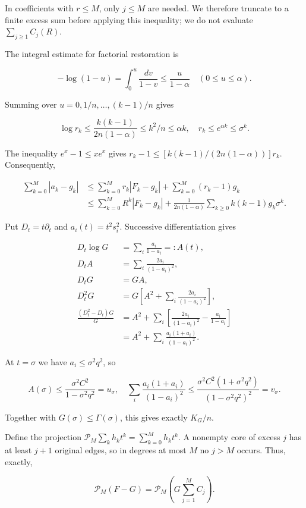 \documentclass[11pt,a4paper]{article}
\begin{document}
In coefficients with \(r\le M\), only \(j\le M\) are needed. We therefore truncate to a finite excess sum before applying this inequality; we do not evaluate \(\sum_{j\ge1}C_j(R)\).

The integral estimate for factorial restoration is

\[
-\log(1-u)=\int_0^u\frac{dv}{1-v}\le\frac{u}{1-\alpha}
\quad(0\le u\le\alpha).
\]

Summing over \(u=0,1/n,\ldots,(k-1)/n\) gives

\[
\log r_k\le\frac{k(k-1)}{2n(1-\alpha)}\le k^2/n\le\alpha k,
\quad r_k\le e^{\alpha k}\le\sigma^k.
\]

The inequality \(e^x-1\le xe^x\) gives \(r_k-1\le[k(k-1)/(2n(1-\alpha))]r_k\). Consequently,

\[
\begin{aligned}
\sum_{k=0}^M|a_k-g_k|
&\le\sum_{k=0}^Mr_k|F_k-g_k|+\sum_{k=0}^M(r_k-1)g_k\\
&\le\sum_{k=0}^MR^k|F_k-g_k|
+\frac1{2n(1-\alpha)}\sum_{k\ge0}k(k-1)g_k\sigma^k.
\end{aligned}
\]

Put \(D_t=t\partial_t\) and \(a_i(t)=t^2s_i^2\). Successive differentiation gives

\[
\begin{aligned}
D_t\log G&=\sum_i\frac{a_i}{1-a_i}=:A(t),\\
D_tA&=\sum_i\frac{2a_i}{(1-a_i)^2},\\
D_tG&=GA,\\
D_t^2G&=G\left[A^2+\sum_i\frac{2a_i}{(1-a_i)^2}\right],\\
\frac{(D_t^2-D_t)G}{G}
&=A^2+\sum_i\left[\frac{2a_i}{(1-a_i)^2}-\frac{a_i}{1-a_i}\right]\\
&=A^2+\sum_i\frac{a_i(1+a_i)}{(1-a_i)^2}.
\end{aligned}
\]

At \(t=\sigma\) we have \(a_i\le\sigma^2q^2\), so

\[
A(\sigma)\le\frac{\sigma^2C^2}{1-\sigma^2q^2}=u_\sigma,
\quad
\sum_i\frac{a_i(1+a_i)}{(1-a_i)^2}
\le\frac{\sigma^2C^2(1+\sigma^2q^2)}{(1-\sigma^2q^2)^2}=v_\sigma.
\]

Together with \(G(\sigma)\le\Gamma(\sigma)\), this gives exactly \(K_G/n\).

Define the projection \(\mathcal P_M\sum_kh_kt^k=\sum_{k=0}^Mh_kt^k\). A nonempty core of excess \(j\) has at least \(j+1\) original edges, so in degrees at most \(M\) no \(j>M\) occurs. Thus, exactly,

\[
\mathcal P_M(F-G)=\mathcal P_M\left(G\sum_{j=1}^MC_j\right).
\]
\end{document}
